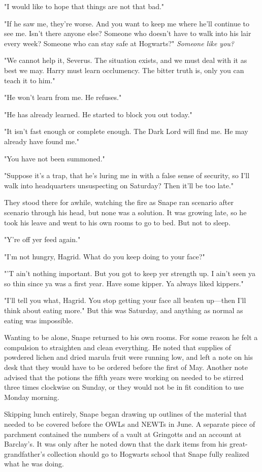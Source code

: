 "I would like to hope that things are not that bad."

"If he saw me, they're worse. And you want to keep me where he'll continue to see me. Isn't there anyone else? Someone who doesn't have to walk into his lair every week? Someone who can stay safe at Hogwarts?" \emph{Someone like you?}

"We cannot help it, Severus. The situation exists, and we must deal with it as best we may. Harry must learn occlumency. The bitter truth is, only you can teach it to him."

"He won't learn from me. He refuses."

"He has already learned. He started to block you out today."

"It isn't fast enough or complete enough. The Dark Lord will find me. He may already have found me."

"You have not been summoned."

"Suppose it's a trap, that he's luring me in with a false sense of security, so I'll walk into headquarters unsuspecting on Saturday? Then it'll be too late."

They stood there for awhile, watching the fire as Snape ran scenario after scenario through his head, but none was a solution. It was growing late, so he took his leave and went to his own rooms to go to bed. But not to sleep.

"Y're off yer feed again."

"I'm not hungry, Hagrid. What do you keep doing to your face?"

"'T ain't nothing important. But you got to keep yer strength up. I ain't seen ya so thin since ya was a first year. Have some kipper. Ya always liked kippers."

"I'll tell you what, Hagrid. You stop getting your face all beaten up—then I'll think about eating more." But this was Saturday, and anything as normal as eating was impossible.

Wanting to be alone, Snape returned to his own rooms. For some reason he felt a compulsion to straighten and clean everything. He noted that supplies of powdered lichen and dried marula fruit were running low, and left a note on his desk that they would have to be ordered before the first of May. Another note advised that the potions the fifth years were working on needed to be stirred three times clockwise on Sunday, or they would not be in fit condition to use Monday morning.

Skipping lunch entirely, Snape began drawing up outlines of the material that needed to be covered before the OWLs and NEWTs in June. A separate piece of parchment contained the numbers of a vault at Gringotts and an account at Barclay's. It was only after he noted down that the dark items from his great-grandfather's collection should go to Hogwarts school that Snape fully realized what he was doing.

